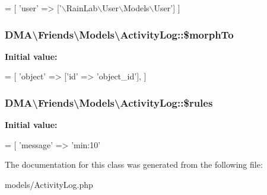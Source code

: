 \begin{DoxyCode}
= [
        \textcolor{stringliteral}{'user'} => [\textcolor{stringliteral}{'\(\backslash\)RainLab\(\backslash\)User\(\backslash\)Models\(\backslash\)User'}]
    ]
\end{DoxyCode}
\hypertarget{classDMA_1_1Friends_1_1Models_1_1ActivityLog_afaa82849e3e93bf41ac948658ac652ff}{
\subsubsection[{\$morph\+To}]{\setlength{\rightskip}{0pt plus 5cm}D\+M\+A\textbackslash{}\+Friends\textbackslash{}\+Models\textbackslash{}\+Activity\+Log\+::\$morph\+To}}\label{classDMA_1_1Friends_1_1Models_1_1ActivityLog_afaa82849e3e93bf41ac948658ac652ff}
{\bfseries Initial value\+:}
\begin{DoxyCode}
= [
        \textcolor{stringliteral}{'object'} => [\textcolor{stringliteral}{'id'} => \textcolor{stringliteral}{'object\_id'}],
    ]
\end{DoxyCode}
\hypertarget{classDMA_1_1Friends_1_1Models_1_1ActivityLog_a0b8a60f69fd1fef78f71d538ca6f12e0}{
\subsubsection[{\$rules}]{\setlength{\rightskip}{0pt plus 5cm}D\+M\+A\textbackslash{}\+Friends\textbackslash{}\+Models\textbackslash{}\+Activity\+Log\+::\$rules\hspace{0.3cm}{\ttfamily [protected]}}}\label{classDMA_1_1Friends_1_1Models_1_1ActivityLog_a0b8a60f69fd1fef78f71d538ca6f12e0}
{\bfseries Initial value\+:}
\begin{DoxyCode}
= [
        \textcolor{stringliteral}{'message'}       => \textcolor{stringliteral}{'min:10'}
\end{DoxyCode}


The documentation for this class was generated from the following file\+:\begin{DoxyCompactItemize}
\item 
models/Activity\+Log.\+php\end{DoxyCompactItemize}
